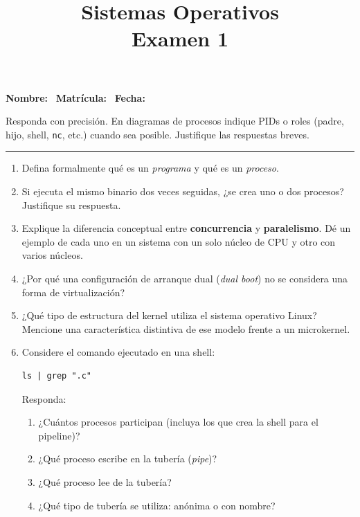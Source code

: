 \documentclass[11pt,a4paper]{article}
\title{\textbf{Sistemas Operativos}\\Examen 1}
\author{}
\date{}
\begin{document}
\maketitle

\noindent\textbf{Nombre:}\ \hrulefill\quad
\textbf{Matrícula:}\ \hrulefill\quad
\textbf{Fecha:}\ \hrulefill

\vspace{0.8em}
\noindent Responda con precisión. En diagramas de procesos indique PIDs o roles (padre, hijo, shell, \texttt{nc}, etc.) cuando sea posible. Justifique las respuestas breves.

\vspace{1em}
\hrule
\vspace{1em}

\begin{enumerate}[label=\textbf{\arabic*.}, leftmargin=*]

\item Defina formalmente qué es un \emph{programa} y qué es un \emph{proceso}.

\item Si ejecuta el mismo binario dos veces seguidas, ¿se crea uno o dos procesos? Justifique su respuesta.

\item Explique la diferencia conceptual entre \textbf{concurrencia} y \textbf{paralelismo}. Dé un ejemplo de cada uno en un sistema con un solo núcleo de CPU y otro con varios núcleos.

\item ¿Por qué una configuración de arranque dual (\emph{dual boot}) no se considera una forma de virtualización?

\item ¿Qué tipo de estructura del kernel utiliza el sistema operativo Linux? Mencione una característica distintiva de ese modelo frente a un microkernel.

\item Considere el comando ejecutado en una shell:
\begin{verbatim}
ls | grep ".c"
\end{verbatim}
Responda:
\begin{enumerate}[label=(\alph*), leftmargin=2em]
  \item ¿Cuántos procesos participan (incluya los que crea la shell para el pipeline)?
  \item ¿Qué proceso escribe en la tubería (\emph{pipe})?
  \item ¿Qué proceso lee de la tubería?
  \item ¿Qué tipo de tubería se utiliza: anónima o con nombre?
\end{enumerate}


\end{enumerate}
\end{document}
